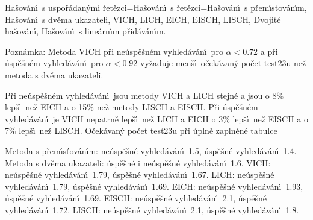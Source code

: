 \phantom{---}Ha\v sov\'an\'\i\ s uspo\v r\'adan\'ymi \v ret\v ezci=Ha\v sov\'an\'\i\ s 
\v ret\v ezci=Ha\v so\-v\'a\-n\'\i\ s p\v rem\'\i s\v tov\'an\'\i m,\newline 
\phantom{---}Ha\v sov\'an\'\i\ s dv\v ema ukazateli,\newline 
\phantom{---}VICH,\newline 
\phantom{---}LICH,\newline 
\phantom{---}EICH,\newline 
\phantom{---}EISCH,\newline 
\phantom{---}LISCH,\newline 
\phantom{---}Dvojit\'e ha\v sov\'an\'\i ,\newline 
\phantom{---}Ha\v sov\'an\'\i\ s line\'arn\'\i m p\v rid\'av\'an\'\i m.
\medskip

\flushpar Pozn\'amka: Metoda VICH p\v ri ne\'usp\v e\v sn\'em vyhled\'av\'an\'\i\ pro 
$\alpha <0.72$ a p\v ri \'usp\v e\v sn\'em vy\-hled\'av\'an\'\i\ pro $
\alpha <0.92$ 
vy\v zaduje men\v s\'\i\ o\v cek\'avan\'y po\v cet test\accent23u ne\v z 
metoda s dv\v ema ukazateli.

\flushpar P\v ri ne\'usp\v e\v sn\'em vyhled\'av\'an\'\i\ jsou metody VICH a LICH stejn\'e a jsou o 8\% lep\v s\'\i\ ne\v z 
EICH a o 15\% ne\v z metody LISCH a EISCH. P\v ri \'usp\v e\v sn\'em vyhled\'av\'an\'\i\ 
je VICH nepatrn\v e lep\v s\'\i\ ne\v z LICH a EICH o 3\% lep\v s\'\i\ ne\v z 
EISCH a o 7\% lep\v s\'\i\ ne\v z LISCH.
\medskip
\subhead
O\v cek\'avan\'y po\v cet test\accent23u p\v ri \'upln\v e zapln\v en\'e 
tabulce
\endsubhead 

\phantom{---}Metoda s p\v rem\'\i s\v tov\'an\'\i m: ne\'usp\v e\v sn\'e vyhled\'av\'an\'\i\ 1.5, \'usp\v e\v sn\'e 
vyhled\'av\'an\'\i\ 1.4.\newline 
\phantom{---}Metoda s dv\v ema ukazateli: \'usp\v e\v sn\'e i ne\'usp\v e\v sn\'e vyhled\'av\'an\'\i\  1.6.\newline 
\phantom{---}VICH: ne\'usp\v e\v sn\'e vyhled\'av\'an\'\i\ 1.79, \'usp\v e\v sn\'e vyhled\'av\'an\'\i\ 
1.67.\newline 
\phantom{---}LICH: ne\'usp\v e\v sn\'e vyhled\'av\'an\'\i\ 1.79, \'usp\v e\v sn\'e vyhled\'av\'an\'\i\ 
1.69.\newline 
\phantom{---}EICH: ne\'usp\v e\v sn\'e vyhled\'av\'an\'\i\ 1.93, \'usp\v e\v sn\'e vyhled\'av\'an\'\i\ 
1.69.\newline 
\phantom{---}EISCH: ne\'usp\v e\v sn\'e vyhled\'av\'an\'\i\ 2.1, \'usp\v e\v sn\'e vyhled\'av\'an\'\i\ 
1.72.\newline 
\phantom{---}LISCH: ne\'usp\v e\v sn\'e vyhled\'av\'an\'\i\ 2.1, \'usp\v e\v sn\'e vyhled\'av\'an\'\i\ 
1.8.
\medskip

